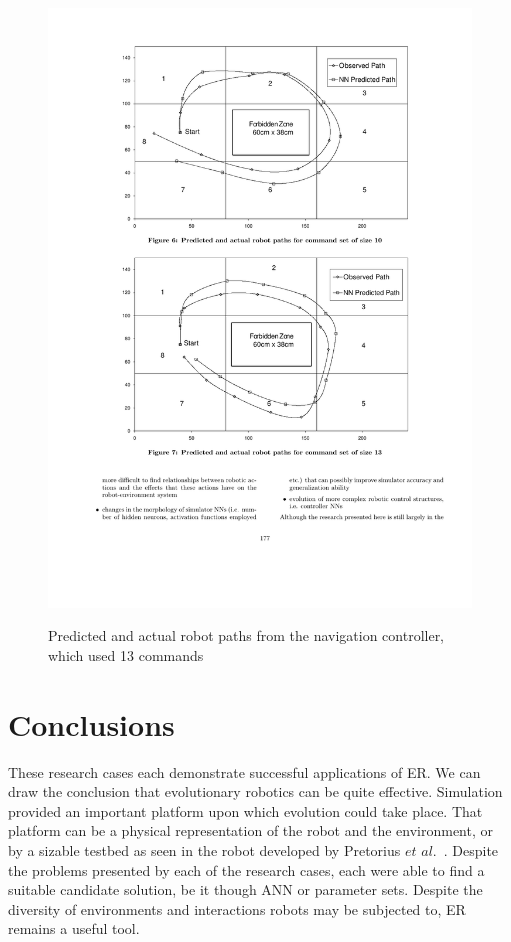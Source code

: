 \documentclass{sig-alternate}
\begin{document}
\begin{figure}%
\center
\caption{Predicted and actual robot paths from the navigation controller, which used 13 commands}

  \includegraphics[scale=1]{cr3}
\label{fig:position tracking grid}
\end{figure}
	  
\section{Conclusions}\label{conclusion}

 These research cases each demonstrate successful applications of ER. We can draw the conclusion that evolutionary robotics can be quite effective. Simulation provided an important platform upon which evolution could take place. That platform can be a physical representation of the robot and the environment, or by a sizable testbed as seen in the robot developed by Pretorius $et$ $al.$~\cite{Pretorius:2009:TAN:1632149.1632171}. Despite the problems presented by each of the research cases, each were able to find a suitable candidate solution, be it though ANN or parameter sets. Despite the diversity of environments and interactions robots may be subjected to, ER remains a useful tool.
\end{document}

